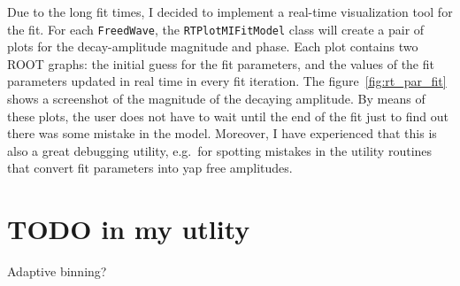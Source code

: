 \documentclass[
    a4paper,
    titlepage,
    BCOR5mm,
    numbers=noenddot,
    cleardoublepage=empty,
    tablecaptionabove
    fontsize=10pt,
    open=right,
    twoside,
    english,
	final
]{scrbook}
\newcommand{\package}[1]{\textsf{#1}}
\newcommand{\ROOT}{{\footnotesize{\package{ROOT}}}}
\newcommand{\eg}{e.g.}
\newcommand{\pac}[1]{\package{\ac{#1}}}
\begin{document}
    Due to the long fit times, I decided to implement a real-time visualization tool for the fit.
    For each \lstinline!FreedWave!, the \lstinline!RTPlotMIFitModel! class will create a pair of plots for the decay-amplitude magnitude and phase.
    Each plot contains two \ROOT{} graphs: the initial guess for the fit parameters, and the values of the fit parameters updated in real time in every fit iteration.
    The figure~\ref{fig:rt_par_fit} shows a screenshot of the magnitude of the \Pfii{} decaying amplitude.
    By means of these plots, the user does not have to wait until the end of the fit just to find out there was some mistake in the model.
    Moreover, I have experienced that this is also a great debugging utility, \eg{}~for spotting mistakes in the utility routines that convert fit parameters into \pac{yap} free amplitudes. 

    \section{TODO in my utlity}
        
        Adaptive binning?

%
\backmatter
	\printnoidxglossaries

	\cleardoublepage
	\printindex

	\cleardoublepage
	\nocite{*}
	\printbibliography
\end{document}
